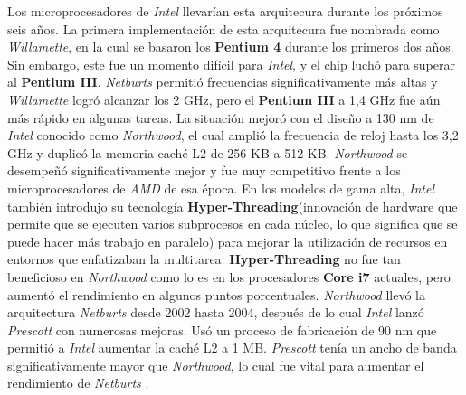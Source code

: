 Los microprocesadores de \emph{Intel} llevarían esta arquitecura durante los próximos seis años. La primera implementación de esta arquitecura fue nombrada como 
\emph{Willamette}, en la cual se basaron los \textbf{Pentium 4} durante los primeros dos años. Sin embargo, este fue un momento difícil para \emph{Intel}, y el chip luchó para 
superar al \textbf{Pentium III}. \emph{Netburts} permitió frecuencias significativamente más altas y \emph{Willamette} logró alcanzar los 2 GHz, pero el \textbf{Pentium III} 
a 1,4 GHz fue aún más rápido en algunas tareas. La situación mejoró con el diseño a 130 nm de \emph{Intel} conocido como \emph{Northwood}, el cual  amplió la frecuencia 
de reloj hasta los 3,2 GHz y duplicó la memoria caché L2 de 256 KB a 512 KB. \emph{Northwood} se desempeñó significativamente mejor y fue muy competitivo frente a los microprocesadores 
de \emph{AMD} de esa época.
En los modelos de gama alta, \emph{Intel} también introdujo su tecnología \textbf{Hyper-Threading}(innovación de hardware que permite que se ejecuten varios subprocesos en cada núcleo, 
lo que significa que se puede hacer más trabajo en paralelo) para mejorar la utilización de recursos en entornos que 
enfatizaban la multitarea. \textbf{Hyper-Threading} no fue tan beneficioso en \emph{Northwood} como lo es en los procesadores \textbf{Core i7} actuales, 
pero aumentó el rendimiento en algunos puntos porcentuales.
\emph{Northwood} llevó la arquitectura \emph{Netburts} desde 2002 hasta 2004, después de lo cual \emph{Intel} lanzó \emph{Prescott} con numerosas mejoras. 
Usó un proceso de fabricación de 90 nm que permitió a \emph{Intel} aumentar la caché L2 a 1 MB.  \emph{Prescott} tenía un ancho de banda significativamente mayor que \emph{Northwood}, 
lo cual fue vital para aumentar el rendimiento de \emph{Netburts} .


